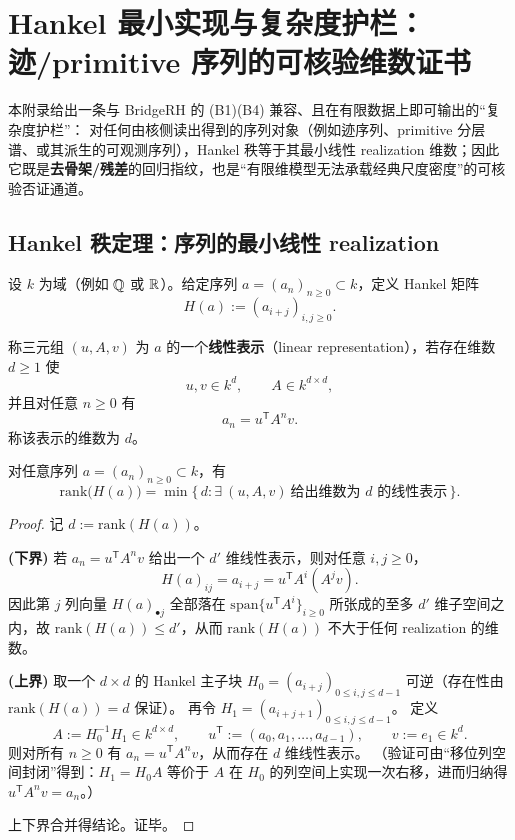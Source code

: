 \section{Hankel 最小实现与复杂度护栏：迹/primitive 序列的可核验维数证书}\label{app:hankel-minreal-guardrails}

本附录给出一条与 BridgeRH 的 (B1)(B4) 兼容、且在有限数据上即可输出的“复杂度护栏”：
对任何由核侧读出得到的序列对象（例如迹序列、primitive 分层谱、或其派生的可观测序列），Hankel 秩等于其最小线性 realization 维数；因此它既是\textbf{去骨架/残差}的回归指纹，也是“有限维模型无法承载经典尺度密度”的可核验否证通道。

\subsection{Hankel 秩定理：序列的最小线性 realization}\label{subsec:hankel-rank-minimal}
设 $k$ 为域（例如 $\mathbb{Q}$ 或 $\mathbb{R}$）。给定序列 $a=(a_n)_{n\ge 0}\subset k$，定义 Hankel 矩阵
$$
H(a):=(a_{i+j})_{i,j\ge 0}.
$$

\begin{definition}\label{def:hankel-linear-representation}
称三元组 $(u,A,v)$ 为 $a$ 的一个\textbf{线性表示}（linear representation），若存在维数 $d\ge 1$ 使
$$
u,v\in k^{d},\qquad A\in k^{d\times d},
$$
并且对任意 $n\ge 0$ 有
$$
a_n=u^{\mathsf T}A^n v.
$$
称该表示的维数为 $d$。
\end{definition}

\begin{theorem}[Hankel 秩定理：秩 $=$ 最小 realization 维数]\label{thm:hankel-rank-minimal}
对任意序列 $a=(a_n)_{n\ge 0}\subset k$，有
$$
\mathrm{rank}\bigl(H(a)\bigr)
=
\min\{\,d:\exists\ (u,A,v)\ \text{给出维数为 }d\text{ 的线性表示}\,\}.
$$
\end{theorem}

\begin{proof}
记 $d:=\mathrm{rank}(H(a))$。
\par
\textbf{(下界)} 若 $a_n=u^{\mathsf T}A^n v$ 给出一个 $d'$ 维线性表示，则对任意 $i,j\ge 0$，
$$
H(a)_{ij}=a_{i+j}=u^{\mathsf T}A^i(A^j v).
$$
因此第 $j$ 列向量 $H(a)_{\bullet j}$ 全部落在 $\mathrm{span}\{u^{\mathsf T}A^i\}_{i\ge 0}$ 所张成的至多 $d'$ 维子空间之内，故 $\mathrm{rank}(H(a))\le d'$，从而 $\mathrm{rank}(H(a))$ 不大于任何 realization 的维数。
\par
\textbf{(上界)} 取一个 $d\times d$ 的 Hankel 主子块 $H_0=(a_{i+j})_{0\le i,j\le d-1}$ 可逆（存在性由 $\mathrm{rank}(H(a))=d$ 保证）。
再令 $H_1=(a_{i+j+1})_{0\le i,j\le d-1}$。
定义
$$
A:=H_0^{-1}H_1\in k^{d\times d},\qquad
u^{\mathsf T}:=(a_0,a_1,\dots,a_{d-1}),\qquad
v:=e_1\in k^{d}.
$$
则对所有 $n\ge 0$ 有 $a_n=u^{\mathsf T}A^n v$，从而存在 $d$ 维线性表示。
（验证可由“移位列空间封闭”得到：$H_1=H_0A$ 等价于 $A$ 在 $H_0$ 的列空间上实现一次右移，进而归纳得 $u^{\mathsf T}A^n v=a_n$。）
\par
上下界合并得结论。证毕。
\end{proof}

